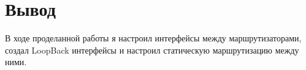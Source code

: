 \chapter{Вывод}
В ходе проделанной работы я настроил интерфейсы между маршрутизаторами, создал LoopBack интерфейсы и настроил статическую маршрутизацию между ними.